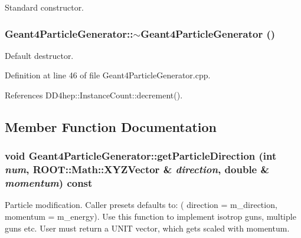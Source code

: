 Standard constructor. \hypertarget{class_d_d4hep_1_1_simulation_1_1_geant4_particle_generator_a4fdb46f784ede918c2970e260e2fe218}{
\subsubsection[{$\sim$Geant4ParticleGenerator}]{\setlength{\rightskip}{0pt plus 5cm}Geant4ParticleGenerator::$\sim$Geant4ParticleGenerator ()}}
\label{class_d_d4hep_1_1_simulation_1_1_geant4_particle_generator_a4fdb46f784ede918c2970e260e2fe218}


Default destructor. 

Definition at line 46 of file Geant4ParticleGenerator.cpp.

References DD4hep::InstanceCount::decrement().

\subsection{Member Function Documentation}
\hypertarget{class_d_d4hep_1_1_simulation_1_1_geant4_particle_generator_ac1bc512eb2de940c32c177a2c342d129}{
\subsubsection[{getParticleDirection}]{\setlength{\rightskip}{0pt plus 5cm}void Geant4ParticleGenerator::getParticleDirection (int {\em num}, \/  ROOT::Math::XYZVector \& {\em direction}, \/  double \& {\em momentum}) const}}
\label{class_d_d4hep_1_1_simulation_1_1_geant4_particle_generator_ac1bc512eb2de940c32c177a2c342d129}


Particle modification. Caller presets defaults to: ( direction = m\_\-direction, momentum = m\_\-energy). Use this function to implement isotrop guns, multiple guns etc. User must return a UNIT vector, which gets scaled with momentum. 

